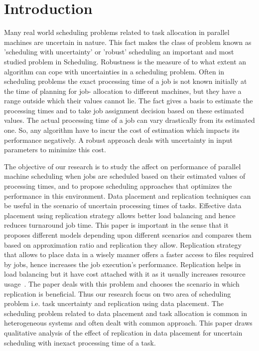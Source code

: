 \documentclass[10pt, conference, compsocconf]{IEEEtran}
\begin{document}
\IEEEpeerreviewmaketitle

\section{Introduction}

Many real world scheduling problems related to task allocation in parallel machines are uncertain in nature. This fact makes the class of problem known as 'scheduling with uncertainty' or 'robust' scheduling an important and most studied problem in Scheduling. Robustness is the measure of to what extent an algorithm can cope with uncertainties in a scheduling problem. Often in scheduling problems the exact processing time of a job is not known initially at the time of planning for job- allocation to different machines, but they have a range outside which their values cannot lie. The fact gives a basis to estimate the processing times and to take job assignment decision based on these estimated values. The actual processing time of a job can vary drastically from its estimated one. So, any algorithm have to incur the cost of estimation which impacts its performance negatively. A robust approach deals with uncertainty in input parameters to minimize this cost.

 The objective of our research is to study the affect on performance of parallel machine scheduling when jobs are scheduled based on their estimated values of processing times, and to propose scheduling approaches that optimizes the performance in this environment. Data  placement and replication techniques can be useful in the scenario of uncertain processing times of tasks. Effective data placement using replication strategy allows better load balancing and hence reduces turnaround job time. This paper is important in the sense that it proposes different models depending upon different scenarios and compares them based on approximation ratio and replication they allow. Replication strategy that allows to place data in a wisely manner offers a faster access to files required by jobs, hence increases the job execution's performance. Replication helps in load balancing but it have cost attached with it as it usually increases resource usage~\cite{DBLP:journals/corr/WangJW14}. The paper deals with this problem and chooses the scenario in which replication is beneficial. Thus our research focus on two area of scheduling problem i.e. task uncertainty and replication using data placement. The scheduling problem related to data placement and task allocation is common in heterogeneous systems and often dealt with common approach. This paper draws qualitative analysis of the effect of replication in data placement for uncertain scheduling with inexact processing time of a task.
\end{document}
